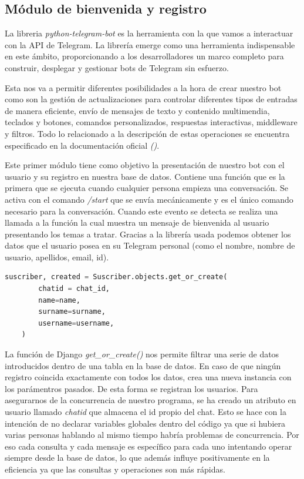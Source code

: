 \subsection{Módulo de bienvenida y registro}

La libreria \textit{python-telegram-bot} es la herramienta con la que vamos a interactuar con la API de Telegram. La librería emerge como una herramienta indispensable en este ámbito, proporcionando a los desarrolladores un marco completo para construir, desplegar y gestionar bots de Telegram sin esfuerzo.

Esta nos va a permitir diferentes posibilidades a la hora de crear nuestro bot como son la gestión de actualizaciones para controlar diferentes tipos de entradas de manera eficiente, envío de mensajes de texto y contenido multimendia, teclados y botones, comandos personalizados, respuestas interactivas, middleware y filtros. Todo lo relacionado a la descripción de estas operaciones se encuentra especificado en la documentación oficial \textit{(\cite{pythontelegrambot})}.

Este primer módulo tiene como objetivo la presentación de nuestro bot con el usuario y su registro en nuestra base de datos. Contiene una función que es la primera que se ejecuta cuando cualquier persona empieza una conversación. Se activa con el comando \textit{/start} que se envía mecánicamente y es el único comando necesario para la conversación. Cuando este evento se detecta se realiza una llamada a la función la cual muestra un mensaje de bienvenida al usuario presentando los temas a tratar. Gracias a la librería usada podemos obtener los datos que el usuario posea en su Telegram personal (como el nombre, nombre de usuario, apellidos, email, id).\vspace{0.3cm}

\begin{lstlisting}[language=Python]
    suscriber, created = Suscriber.objects.get_or_create(
        chatid = chat_id,
        name=name,
        surname=surname,
        username=username,
    )
\end{lstlisting}

 La función de Django \textit{get\_or\_create()} nos permite filtrar una serie de datos introducidos dentro de una tabla en la base de datos. En caso de que ningún registro coincida exactamente con todos los datos, crea una nueva instancia con los parámentros pasados. De esta forma se registran los usuarios. Para asegurarnos de la concurrencia de nuestro programa, se ha creado un atributo en usuario llamado \textit{chatid} que almacena el id propio del chat. Esto se hace con la intención de no declarar variables globales dentro del código ya que si hubiera varias personas hablando al mismo tiempo habría problemas de concurrencia. Por eso cada consulta y cada mensaje es específico para cada uno intentando operar siempre desde la base de datos, lo que además influye positivamente en la eficiencia ya que las consultas y operaciones son más rápidas.


